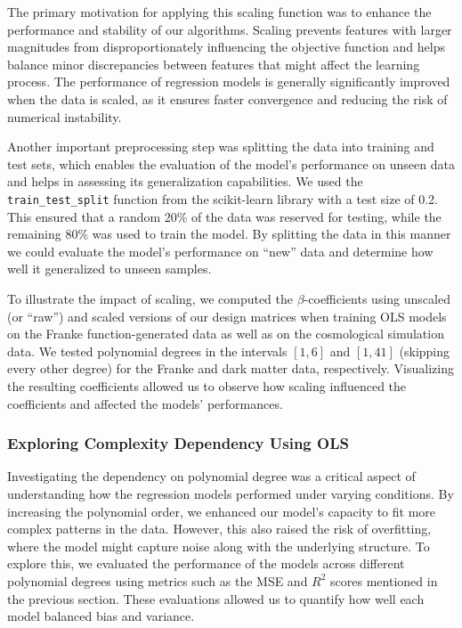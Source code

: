 \documentclass[aps,pra,english,notitlepage,reprint,nofootinbib]{revtex4-1}  %
\begin{document}
The primary motivation for applying this scaling function was to enhance the performance and stability of our algorithms. Scaling prevents features with larger magnitudes from disproportionately influencing the objective function and helps balance minor discrepancies between features that might affect the learning process. The performance of regression models is generally significantly improved when the data is scaled, as it ensures faster convergence and reducing the risk of numerical instability.

Another important preprocessing step was splitting the data into training and test sets, which enables the evaluation of the model's performance on unseen data and helps in assessing its generalization capabilities. We used the \verb|train_test_split| function from the scikit-learn library with a test size of 0.2. This ensured that a random 20\% of the data was reserved for testing, while the remaining 80\% was used to train the model. By splitting the data in this manner we could evaluate the model's performance on ``new'' data and determine how well it generalized to unseen samples.

To illustrate the impact of scaling, we computed the $\beta$-coefficients using unscaled (or ``raw'') and scaled versions of our design matrices when training OLS models on the Franke function-generated data as well as on the cosmological simulation data. We tested polynomial degrees in the intervals $[1,6]$ and $[1,41]$ (skipping every other degree) for the Franke and dark matter data, respectively. Visualizing the resulting coefficients allowed us to observe how scaling influenced the coefficients and affected the models' performances. 

\subsubsection{Exploring Complexity Dependency Using OLS}
Investigating the dependency on polynomial degree was a critical aspect of understanding how the regression models performed under varying conditions. By increasing the polynomial order, we enhanced our model's capacity to fit more complex patterns in the data. However, this also raised the risk of overfitting, where the model might capture noise along with the underlying structure. To explore this, we evaluated the performance of the models across different polynomial degrees using metrics such as the MSE and $R^2$ scores mentioned in the previous section. These evaluations allowed us to quantify how well each model balanced bias and variance. 
\end{document}
